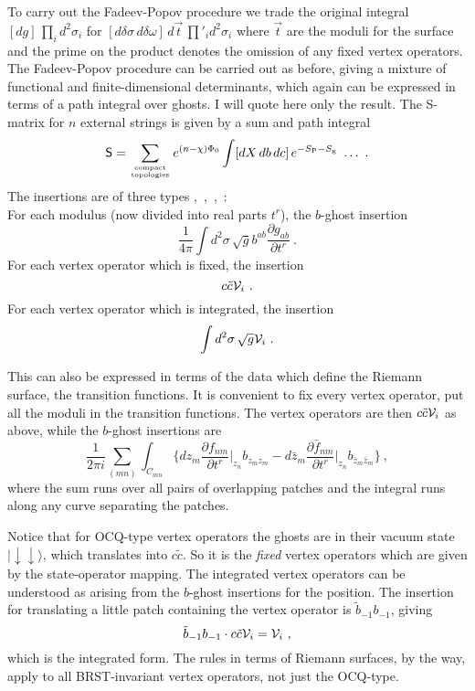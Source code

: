 To carry out the Fadeev-Popov procedure we trade the original
integral $[dg]\,\prod_i d^2\sigma_i$ for
$[d\delta\sigma\,d\delta\omega]\,d\vec{t}\,\prod'_i d^2\sigma_i$
where $\vec{t}$ are the moduli for the surface and the
prime on the product denotes the omission of any fixed vertex
operators.  The Fadeev-Popov procedure can be carried out as before,
giving a mixture of functional and finite-dimensional determinants,
which again can be expressed in terms of a path integral over ghosts.
I will quote here only the result.  The S-matrix for $n$ external
strings is given by a sum and path integral
\begin{equation}
{\sf S} = \sum_{\rm compact \atop topologies}e^{(n - \chi)\Phi_0} 
\int [dX\,db\,dc]\, e^{-S_{\rm P} - S_{\rm g} } \ \ldots\ .
\end{equation}
The insertions are of three types
\cite{FMS},~\cite{Msrs},~\cite{Gid_PR},~\cite{JBBS}:\\[3pt]
For each modulus (now divided into real parts $t^r$), the $b$-ghost
insertion
\begin{equation}
\frac{1}{4\pi} \int d^2 \sigma \,\sqrt{g} b^{ab} \frac{\partial
g_{ab}}{\partial t^r}\ .  \label{bins}
\end{equation}
For each vertex operator which is fixed, the insertion
\begin{equation}
c \tilde c {\cal V}_i\ .
\end{equation}
For each vertex operator which is integrated, the insertion
\begin{equation}
\int d^2\sigma\,\sqrt{g} {\cal V}_i\ .
\end{equation}

This can also be expressed in terms of the data which define the
Riemann surface, the transition functions.  It is convenient to fix
every vertex operator, put all the moduli in the transition
functions.  The vertex operators are then $c \tilde c {\cal V}_i$
as above, while the $b$-ghost insertions are
\begin{equation}
\frac{1}{2\pi i} \sum_{(mn)} \int_{C_{mn}} 
\biggl\{ dz_m \frac{\partial f_{nm}}{\partial t^r} \biggr|_{z_n} b_{z_m
z_m} - {d\bar z_m} \frac{\partial \bar f_{nm}}{\partial t^r}
\biggr|_{z_n} b_{\bar z_m \bar z_m} \biggr\}\ , \label{bins2}
\end{equation}
where the sum runs over all pairs of overlapping patches and the
integral runs along any curve separating the patches.

Notice that for OCQ-type vertex operators the ghosts are in their
vacuum state $|\! \downarrow\downarrow \rangle$, which translates
into $c\tilde c$.  So it is the {\it fixed} vertex operators which
are given by the state-operator mapping.  The integrated vertex
operators can be understood as arising from the $b$-ghost insertions
for the position.  The insertion for translating a little patch
containing the vertex operator is $\tilde b_{-1} b_{-1}$, giving
\begin{equation}
\tilde b_{-1} b_{-1} \cdot c \tilde c {\cal V}_i
= {\cal V}_i\ ,
\end{equation}
which is the integrated form.  The rules in terms of Riemann
surfaces, by the way, apply to all BRST-invariant vertex operators,
not just the OCQ-type.

